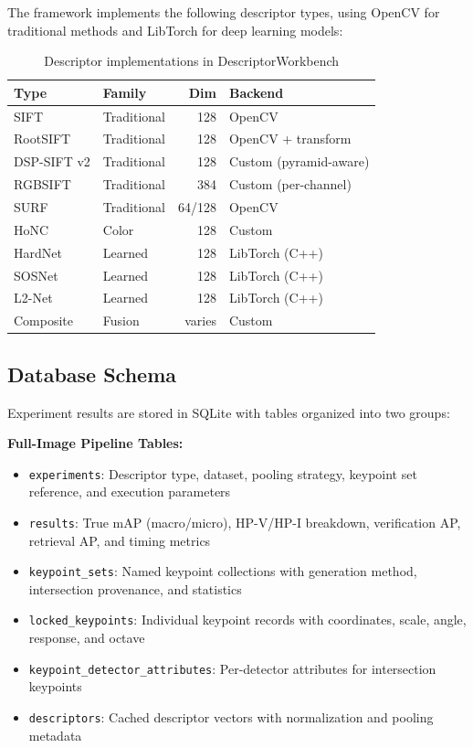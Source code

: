 The framework implements the following descriptor types, using OpenCV for traditional methods and LibTorch for deep learning models:

\begin{table}[ht]
\centering
\caption{Descriptor implementations in DescriptorWorkbench}
\label{tab:descriptors}
\begin{tabular}{llrl}
\toprule
\textbf{Type} & \textbf{Family} & \textbf{Dim} & \textbf{Backend} \\
\midrule
SIFT & Traditional & 128 & OpenCV \\
RootSIFT & Traditional & 128 & OpenCV + transform \\
DSP-SIFT v2 & Traditional & 128 & Custom (pyramid-aware) \\
RGBSIFT & Traditional & 384 & Custom (per-channel) \\
SURF & Traditional & 64/128 & OpenCV \\
HoNC & Color & 128 & Custom \\
HardNet & Learned & 128 & LibTorch (C++) \\
SOSNet & Learned & 128 & LibTorch (C++) \\
L2-Net~\cite{tian2017l2net} & Learned & 128 & LibTorch (C++) \\
Composite & Fusion & varies & Custom \\
\bottomrule
\end{tabular}
\end{table}

\subsection{Database Schema}

Experiment results are stored in SQLite with tables organized into two groups:

\textbf{Full-Image Pipeline Tables:}
\begin{itemize}
    \item \texttt{experiments}: Descriptor type, dataset, pooling strategy, keypoint set reference, and execution parameters
    \item \texttt{results}: True mAP (macro/micro), HP-V/HP-I breakdown, verification AP, retrieval AP, and timing metrics
    \item \texttt{keypoint\_sets}: Named keypoint collections with generation method, intersection provenance, and statistics
    \item \texttt{locked\_keypoints}: Individual keypoint records with coordinates, scale, angle, response, and octave
    \item \texttt{keypoint\_detector\_attributes}: Per-detector attributes for intersection keypoints
    \item \texttt{descriptors}: Cached descriptor vectors with normalization and pooling metadata
\end{itemize}

